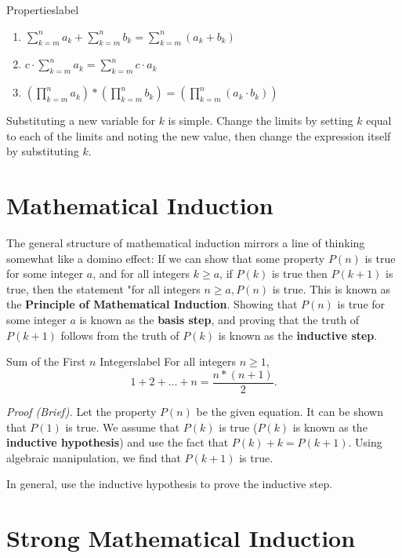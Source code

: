 \documentclass[a4paper]{report}
\begin{document}
\begin{theorem}{Properties}{label}
    \begin{enumerate}
        \item $\sum_{k=m}^{n} a_k + \sum_{k=m}^{n} b_k = \sum_{k=m}^{n} (a_k+b_k)$
        \item $c \cdot \sum_{k=m}^{n} a_k = \sum_{k=m}^{n} c \cdot a_k$
        \item $(\prod_{k=m}^{n} a_k) * (\prod_{k=m}^{n} b_k) = (\prod_{k=m}^{n} (a_k \cdot b_k))$
    \end{enumerate}
\end{theorem}

Substituting a new variable for $k$ is simple. Change the limits by setting $k$ equal to each of the
limits and noting the new value, then change the expression itself by substituting $k$.

\section{Mathematical Induction}

The general structure of mathematical induction mirrors a line of thinking somewhat like a domino effect:
If we can show that some property $P(n)$ is true for some integer $a$, and for all integers $k \ge a$,
if $P(k)$ is true then $P(k+1)$ is true, then the statement "for all integers $n \ge a, P(n)$ is true.
This is known as the \textbf{Principle of Mathematical Induction}. Showing that $P(n)$ is true for some
integer $a$ is known as the \textbf{basis step}, and proving that the truth of $P(k+1)$ follows from the 
truth of $P(k)$ is known as the \textbf{inductive step}.

\begin{example}{Sum of the First $n$ Integers}{label}
    For all integers $n \ge 1$, \[
        1+2+\ldots+n=\frac{n*(n+1)}{2}
    .\] 
\end{example}

\emph{Proof (Brief).} Let the property $P(n)$ be the given equation. It can be shown that $P(1)$ is true.
We assume that $P(k)$ is true ($P(k)$ is known as the \textbf{inductive hypothesis}) and use the fact
that $P(k)+k=P(k+1)$. Using algebraic manipulation, we find that $P(k+1)$ is true.

In general, use the inductive hypothesis to prove the inductive step.

\section{Strong Mathematical Induction}
\end{document}
